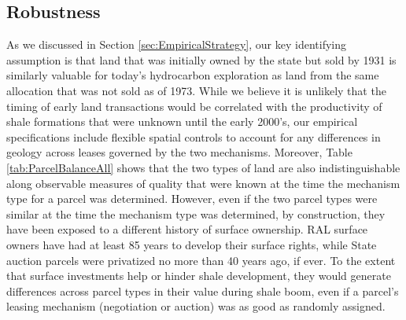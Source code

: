\documentclass[12pt]{article}
\begin{document}
\subsection{Robustness \label{sec:BonusRobustness}}
As we discussed in Section \ref{sec:EmpiricalStrategy}, our key identifying assumption is that land that was initially owned by the state but sold by 1931 is similarly valuable for today's hydrocarbon exploration as land from the same allocation that was not sold as of 1973. While we believe it is unlikely that the timing of early land transactions would be correlated with the productivity of shale formations that were unknown until the early 2000's, our empirical specifications include flexible spatial controls to account for any differences in geology across leases governed by the two mechanisms.  Moreover, Table \ref{tab:ParcelBalanceAll} shows that the two types of land are also indistinguishable along observable measures of quality that were known at the time the mechanism type for a parcel was determined.  However, even if the two parcel types were similar at the time the mechanism type was determined, by construction, they have been exposed to a different history of surface ownership.  RAL surface owners have had at least 85 years to develop their surface rights, while State auction parcels were privatized no more than 40 years ago, if ever. To the extent that surface investments help or hinder shale development, they would generate differences across parcel types in their value during shale boom, even if a parcel's leasing mechanism (negotiation or auction) was as good as randomly assigned. 
\end{document}
